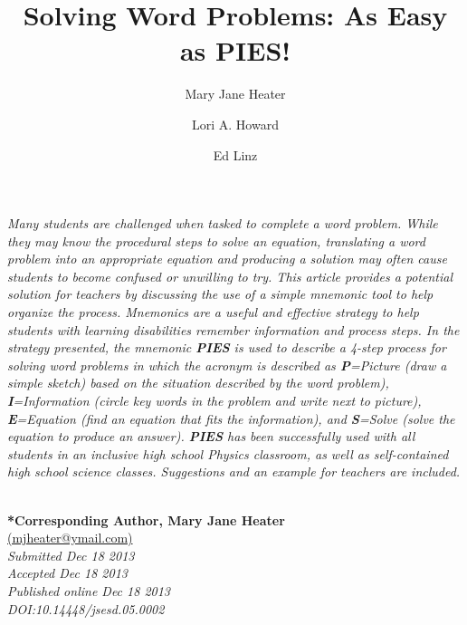 \documentclass[11.5pt]{sig-alternate} %
\makeatletter
\let\oldabstract\abstract
\let\oldendabstract\endabstract
\renewenvironment{abstract} %
{\renewenvironment{quotation}%
               {\list{}{\addtolength{\leftmargin}{1em} %
                        \listparindent 1.5em%
                        \itemindent    \listparindent%
                        \rightmargin   \leftmargin%
                        \parsep        \z@ \@plus\p@}%
                \item\relax}%
               {\endlist}%
\oldabstract}
{\oldendabstract}
\makeatother
\begin{document}
\title{Solving Word Problems: As Easy as PIES!}

\author[1]{\large \color{blue}Mary Jane Heater}
\author[2]{\large \color{blue}Lori A. Howard}
\author[3]{\large \color{blue}Ed Linz}


\toappear{}
\maketitle
\begin{@twocolumnfalse} 
\begin{abstract}
\item 
\textit{Many students are challenged when tasked to complete a word problem.  While they may know the procedural steps to solve an equation, translating a word problem into an appropriate equation and producing a solution may often cause students to become confused or unwilling to try.  This article provides a potential solution for teachers by discussing the use of a simple mnemonic tool to help organize the process.  Mnemonics are a useful and effective strategy to help students with learning disabilities remember information and process steps.  In the strategy presented, the mnemonic \textbf{PIES} is used to describe a 4-step process for solving word problems in which the acronym is described as \textbf{P}=Picture (draw a simple sketch) based on the situation described by the word problem), \textbf{I}=Information (circle key words in the problem and write next to picture), \textbf{E}=Equation (find an equation that fits the information), and \textbf{S}=Solve (solve the equation to produce an answer). \textbf{PIES} has been successfully used with all students in an inclusive high school Physics classroom, as well as self-contained high school science classes. Suggestions and an example for teachers are included.}
\\ \\
 
\end{abstract}
\end{@twocolumnfalse}


\textbf{*Corresponding Author, Mary Jane Heater}\\
\href{mailto: mjheater@ymail.com }{(mjheater@ymail.com)} \\
\textit{Submitted Dec 18 2013 }\\
\textit{Accepted Dec 18 2013} \\
\textit{Published online Dec 18 2013 } \\
\textit{DOI:10.14448/jsesd.05.0002} \\
\pagebreak
\clearpage
\end{document}

